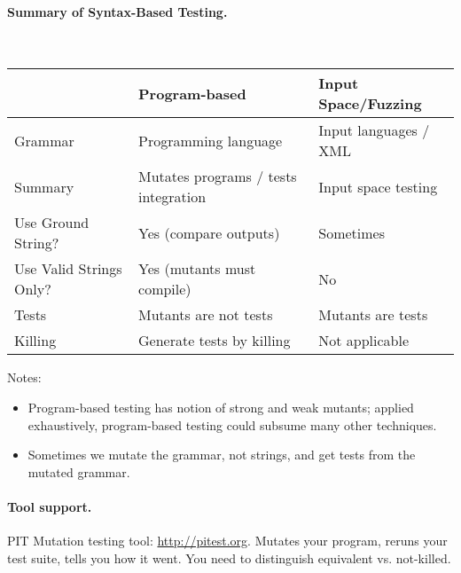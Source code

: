 \documentclass[11pt]{article}
\begin{document}
\vspace*{-1em}
\paragraph{Summary of Syntax-Based Testing.}~\\

\begin{tabular}{l|ll}
& Program-based & Input Space/Fuzzing \\ \hline
Grammar & Programming language & Input languages / XML \\
Summary & Mutates programs / tests integration & Input space testing \\
Use Ground String? & Yes (compare outputs) & Sometimes \\
Use Valid Strings Only? & Yes (mutants must compile) & No \\
Tests & Mutants are not tests & Mutants are tests \\
Killing & Generate tests by killing & Not applicable \\
\end{tabular}

Notes: 
\begin{itemize}[noitemsep]
\item Program-based testing has notion of strong and weak mutants; applied
exhaustively, program-based testing could subsume many other techniques.
\item Sometimes we mutate the grammar, not strings, and get tests from the
mutated grammar.
\end{itemize}

\paragraph{Tool support.} PIT Mutation testing tool: \url{http://pitest.org}. Mutates
your program, reruns your test suite, tells you how it went. You need to distinguish equivalent vs. not-killed.
\end{document}
